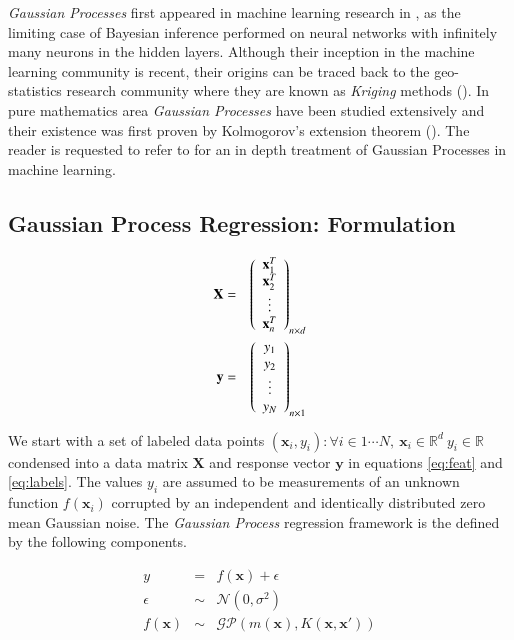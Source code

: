 \documentclass[referee,a4paper,12pt,traditabstract]{swsc}
\begin{document}
\begin{linenumbers}
\emph{Gaussian Processes} first appeared in machine learning research in \citet{Neal:1996:BLN:525544}, as the limiting case of Bayesian inference performed on neural networks with infinitely many neurons in the hidden layers. Although their inception in the machine learning community is recent, their origins can be traced back to the geo-statistics research community where they are known as \emph{Kriging} methods (\citet{krige1951statistical}). In pure mathematics area \emph{Gaussian Processes} have been studied extensively and their existence was first proven by Kolmogorov's extension theorem (\citet{tao2011introduction}). The reader is requested to refer to \cite{Rasmussen:2005:GPM:1162254} for an in depth treatment of Gaussian Processes in machine learning.

\subsection{Gaussian Process Regression: Formulation}

\begin{eqnarray}
  \mathbf{X} & = & \left( \begin{array}{c} \mathbf{x}^{T}_1 \\ \mathbf{x}^{T}_2 \\ \vdots \\ \mathbf{x}^{T}_n \end{array} \right)_{n \times d} \label{eq:feat} \\
  \vspace{2\baselineskip}
  \mathbf{y} & = & \left( \begin{array}{c} y_1 \\ y_2 \\ \vdots \\ y_N \end{array} \right) _{n \times 1} \label{eq:labels}
\end{eqnarray}

We start with a set of labeled data points $ {(\mathbf{x}_i, y_i): \forall i \in 1 \cdots N, \ \mathbf{x}_i \in \mathbb{R}^d \ y_i \in \mathbb{R}} $ condensed into a data matrix $\mathbf{X}$ and response vector $\mathbf{y}$ in equations \ref{eq:feat} and \ref{eq:labels}. The values $y_i$ are assumed to be measurements of an unknown function $f(\mathbf{x}_i)$ corrupted by an independent and identically distributed zero mean Gaussian noise. The \emph{Gaussian Process} regression framework is the defined by the following components.

\begin{eqnarray}
      y & = & f(\mathbf{x}) + \epsilon  \\
      \epsilon & \sim & \mathcal{N}(0, \sigma^2) \\
      f(\mathbf{x}) & \sim & \mathcal{GP}(m(\mathbf{x}), K(\mathbf{x},\mathbf{x}')) 
\end{eqnarray}



\end{linenumbers}
\end{document}

